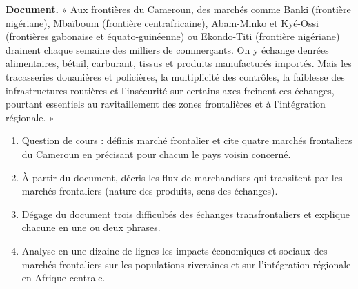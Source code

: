 \documentclass[11pt]{article}
\newcommand{\cle}[1]{{\popxbold\color{popdark}#1}}
\begin{document}
\begin{exercice}
\textbf{Document.} « Aux frontières du Cameroun, des marchés comme Banki (frontière nigériane), Mbaïboum (frontière centrafricaine), Abam-Minko et Kyé-Ossi (frontières gabonaise et équato-guinéenne) ou Ekondo-Titi (frontière nigériane) drainent chaque semaine des milliers de commerçants. On y échange denrées alimentaires, bétail, carburant, tissus et produits manufacturés importés. Mais les tracasseries douanières et policières, la multiplicité des contrôles, la faiblesse des infrastructures routières et l'insécurité sur certains axes freinent ces échanges, pourtant essentiels au ravitaillement des zones frontalières et à l'intégration régionale. »

\begin{enumerate}
\item Question de cours : définis \cle{marché frontalier} et cite quatre marchés frontaliers du Cameroun en précisant pour chacun le pays voisin concerné.
\item À partir du document, décris les flux de marchandises qui transitent par les marchés frontaliers (nature des produits, sens des échanges).
\item Dégage du document trois difficultés des échanges transfrontaliers et explique chacune en une ou deux phrases.
\item Analyse en une dizaine de lignes les impacts économiques et sociaux des marchés frontaliers sur les populations riveraines et sur l'intégration régionale en Afrique centrale.
\end{enumerate}
\end{exercice}
\end{document}
